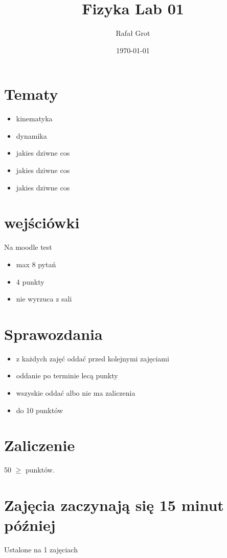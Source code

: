 \documentclass[11pt]{article}
\author{Rafał Grot}
\date{\today}
\title{Fizyka Lab 01}
\begin{document}
\maketitle
\tableofcontents

\section{Tematy}
\label{sec:org78fa427}
\begin{itemize}
\item kinematyka
\item dynamika
\item jakies dziwne cos
\item jakies dziwne cos
\item jakies dziwne cos
\end{itemize}
\section{wejściówki}
\label{sec:org9baac09}
Na moodle test
\begin{itemize}
\item max 8 pytań
\item 4 punkty
\item nie wyrzuca z sali
\end{itemize}
\section{Sprawozdania}
\label{sec:orgdce06cb}
\begin{itemize}
\item z każdych zajęć oddać przed kolejnymi zajęciami
\item oddanie po terminie lecą punkty
\item wszyskie oddać albo nie ma zaliczenia
\item do 10 punktów
\end{itemize}
\section{Zaliczenie}
\label{sec:orgb20f54a}
50 \(\geq\) punktów.
\section{Zajęcia zaczynają się 15 minut później}
\label{sec:org8daec95}
Ustalone na 1 zajęciach
\end{document}
